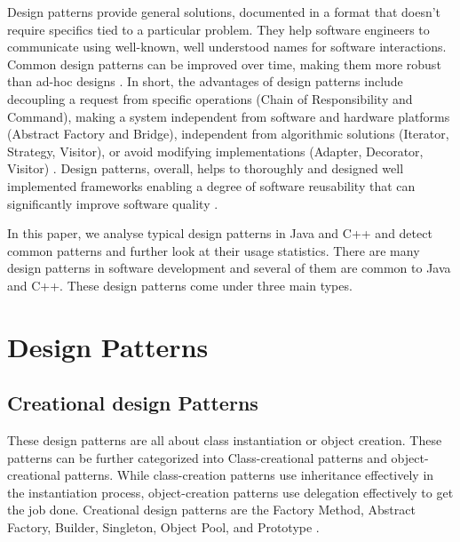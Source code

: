 \documentclass[sigplan,12pt,nonacm=true,review=false]{acmart}
\begin{document}
Design patterns provide general solutions, documented in a format that doesn't require specifics tied to a particular problem. They help software engineers to communicate using well-known, well understood names for software interactions. Common design patterns can be improved over time, making them more robust than ad-hoc designs \cite{noauthor_design_nodate, schmidt_software_1996}. In short, the advantages of design patterns include decoupling a request from specific operations (Chain of Responsibility and Command), making a system independent from software and hardware platforms (Abstract Factory and Bridge), independent from algorithmic solutions (Iterator, Strategy, Visitor), or avoid modifying implementations (Adapter, Decorator, Visitor) \cite{aversano_empirical_2007}. Design patterns, overall, helps to thoroughly and designed well implemented frameworks enabling a degree of software reusability that can significantly improve software quality \cite{pree_design_1997, zhang_what_2012, }.


In this paper, we analyse typical design patterns in Java and C++ and detect common patterns and further look at their usage statistics. There are many design patterns in software development and several of them are common to Java and C++. These design patterns come under three main types.

\section{Design Patterns}
\subsection{Creational design Patterns}
These design patterns are all about class instantiation or object creation. These patterns can be further categorized into Class-creational patterns and object-creational patterns. While class-creation patterns use inheritance effectively in the instantiation process, object-creation patterns use delegation effectively to get the job done. Creational design patterns are the Factory Method, Abstract Factory, Builder, Singleton, Object Pool, and Prototype \cite{kuchana_software_2004, zimmer_relationships_1995}.
\end{document}
